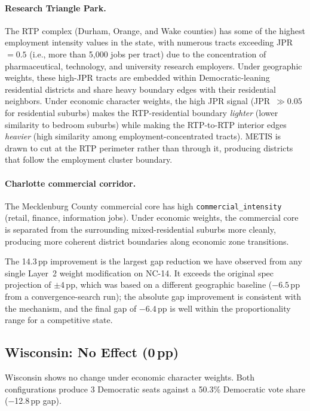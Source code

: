 \paragraph{Research Triangle Park.}
The RTP complex (Durham, Orange, and Wake counties) has some of the highest
employment intensity values in the state, with numerous tracts
exceeding JPR~$= 0.5$ (i.e., more than 5,000 jobs per tract) due to the
concentration of pharmaceutical, technology, and university research employers.
Under geographic weights, these high-JPR tracts are embedded within
Democratic-leaning residential districts and share heavy boundary edges
with their residential neighbors.
Under economic character weights, the high JPR signal (JPR~$\gg 0.05$ for
residential suburbs) makes the RTP-residential boundary \emph{lighter}
(lower similarity to bedroom suburbs)
while making the RTP-to-RTP interior edges \emph{heavier} (high similarity
among employment-concentrated tracts).
METIS is drawn to cut at the RTP perimeter rather than through it, producing
districts that follow the employment cluster boundary.

\paragraph{Charlotte commercial corridor.}
The Mecklenburg County commercial core has high \texttt{commercial\_intensity}
(retail, finance, information jobs).
Under economic weights, the commercial core is separated from the surrounding
mixed-residential suburbs more cleanly, producing more coherent district
boundaries along economic zone transitions.

The 14.3\,pp improvement is the largest gap reduction we have observed from
any single Layer~2 weight modification on NC-14.
It exceeds the original spec projection of $\pm 4$\,pp, which was based on a
different geographic baseline ($-6.5$\,pp from a convergence-search run);
the absolute gap improvement is consistent with the mechanism, and the final
gap of $-6.4$\,pp is well within the proportionality range for a competitive
state.

\subsection{Wisconsin: No Effect (0\,pp)}

Wisconsin shows no change under economic character weights.
Both configurations produce 3 Democratic seats against a 50.3\% Democratic
vote share ($-$12.8\,pp gap).

